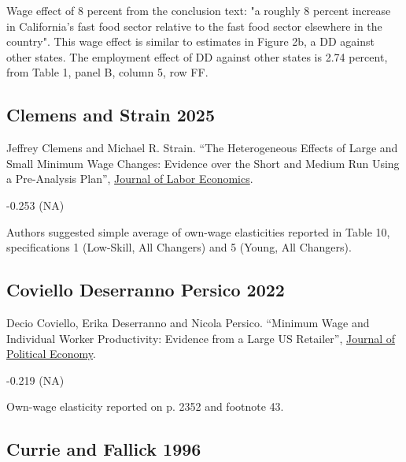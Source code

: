  Wage effect of 8 percent from the conclusion text: "a roughly 8 percent increase in California's fast food sector relative to the fast food sector elsewhere in the country". This wage effect is similar to estimates in Figure 2b, a DD against other states. The employment effect of DD against other states is 2.74 percent, from Table 1, panel B, column 5, row FF.

\subsection*{Clemens and Strain 2025}
\vspace{-0.7em}

\noindent Jeffrey Clemens and Michael R. Strain. ``The Heterogeneous Effects of Large and Small Minimum Wage Changes: Evidence over the Short and Medium Run Using a Pre-Analysis Plan'', \href{https://doi.org/10.1086/736552}{Journal of Labor Economics}.

\vspace{0.7em}

 -0.253 (NA)

\vspace{0.7em}

 Authors suggested simple average of own-wage elasticities reported in Table 10, specifications 1 (Low-Skill, All Changers) and 5 (Young, All Changers).

\subsection*{Coviello Deserranno Persico 2022}
\vspace{-0.7em}

\noindent Decio Coviello, Erika Deserranno and Nicola Persico. ``Minimum Wage and Individual Worker Productivity: Evidence from a Large US Retailer'', \href{https://doi.org/10.1086/720397}{Journal of Political Economy}.

\vspace{0.7em}

 -0.219 (NA)

\vspace{0.7em}

 Own-wage elasticity reported on p. 2352 and footnote 43.

\subsection*{Currie and Fallick 1996}
\vspace{-0.7em}

